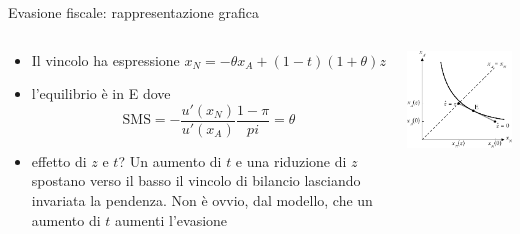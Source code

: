 \documentclass[aspectratio=64,11pt]{beamer}
\begin{document}
\begin{frame}{Evasione fiscale: rappresentazione grafica}
\begin{columns}
\begin{column}{.45\columnwidth}
\begin{itemize}
\item Il vincolo ha espressione $x_N=-\theta x_A+(1-t)(1+\theta)z$
\item l'equilibrio è in E dove
\begin{equation*}
 \text{SMS} = - \frac{u'(x_N)}{u'(x_A)}\frac{1-\pi}{pi}=\theta
\end{equation*}
\item effetto di $z$ e $t$? Un aumento di $t$ e una riduzione di $z$ spostano verso il basso il vincolo di bilancio lasciando invariata la pendenza. Non è ovvio, dal modello, che un aumento di $t$ aumenti l'evasione
\end{itemize}
\end{column}
\begin{column}{.55\columnwidth}
\begin{center}
\includegraphics[width=\textwidth]{./figure/evasione-2.pdf}
\end{center}
\end{column}
\end{columns}
\end{frame}
\end{document}
